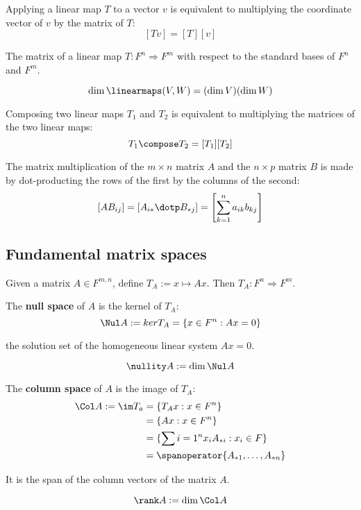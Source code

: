 \begin{lemma}
  Applying a linear map $T$ to a vector $v$ is equivalent to multiplying the coordinate vector of $v$ by the matrix of $T$:
  \[
    [Tv] = [T][v]
  \]
\end{lemma}

\begin{definition}
  The matrix of a linear map $T : F^n \Rightarrow F^m$ with respect to the standard bases of $F^n$ and $F^m$.
\end{definition}

\begin{lemma}
  \[
    \dim \linearmaps(V, W) = (\dim V) (\dim W)
  \]
\end{lemma}

\begin{lemma}
  Composing two linear maps $T_1$ and $T_2$ is equivalent to multiplying the matrices of the two linear maps:
  \[
    T_1 \compose T_2 = [T_1] [T_2]
  \]
\end{lemma}

\begin{definition}
  The matrix multiplication of  the $m \times n$ matrix $A$ and the $n \times p$ matrix $B$ is made by dot-producting the rows of the first by the columns of the second:
  \[
    \left[AB_{ij}\right] = \left[A_{i*} \dotp B_{*j}\right] = \left[\sum_{k=1}^n a_{ik} b_{kj} \right]
  \]
\end{definition}

\subsection{Fundamental matrix spaces}

Given a matrix $A \in F^{m,n}$, define $T_A := x \mapsto Ax$. Then $T_A : F^n \Rightarrow F^m$.

\begin{definition}
  The \textbf{null space} of $A$ is the kernel of $T_A$:
  \[
    \Nul A := ker T_A = \{x \in F^n : Ax = 0\}
  \]

  the solution set of the homogeneous linear system $Ax = 0$. 

  \[
    \nullity A := \dim \Nul A
  \]
\end{definition}

\begin{definition}
  The \textbf{column space} of $A$ is the image of $T_A$:
  \begin{align*}
    \Col A := \im T_a 
    &= \{T_A x : x \in F^n \} \\
    &= \{Ax : x \in F^n \} \\
    &= \{ \sum{i = 1}^n x_i A_{*i} : x_i \in F \} \\
    &= \spanoperator \{ A_{*1}, \ldots, A_{*n} \}
  \end{align*}

  It is the span of the column vectors of the matrix $A$.

  \[
    \rank A := \dim \Col A
  \]
\end{definition}

